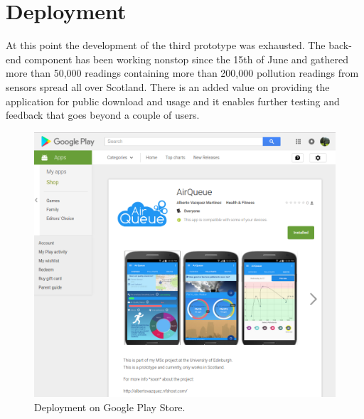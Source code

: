 \section{Deployment}
At this point the development of the third prototype was exhausted. The back-end component has been working nonstop since the 15th of June and gathered more than 50,000 readings containing more than 200,000 pollution readings from sensors spread all over Scotland. There is an added value on providing the application for public download and usage and it enables further testing and feedback that goes beyond a couple of users.

\begin{figure}[H]
\begin{adjustbox}{width=1\textwidth,center=\textwidth}
  \centering
  \includegraphics[scale=1]{images/play_store.png}
\end{adjustbox}
  \caption[Deployment on Google Play Store]{Deployment on Google Play Store.\footnotemark}
  \label{fig:deployment_play_store}
\end{figure}


